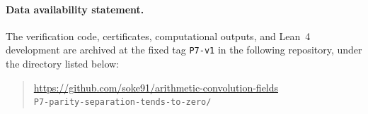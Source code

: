 \documentclass[11pt,a4paper]{article}
\theoremstyle{plain}
\theoremstyle{definition}
\theoremstyle{remark}
\begin{document}
\paragraph{Data availability statement.}
The verification code, certificates, computational outputs, and Lean~4 development are archived
at the fixed tag \texttt{P7-v1} in the following repository, under the directory listed below:
\begin{quote}
\small\raggedright
\url{https://github.com/soke91/arithmetic-convolution-fields}\\
\texttt{P7-parity-separation-tends-to-zero/}
\end{quote}

\end{document}
